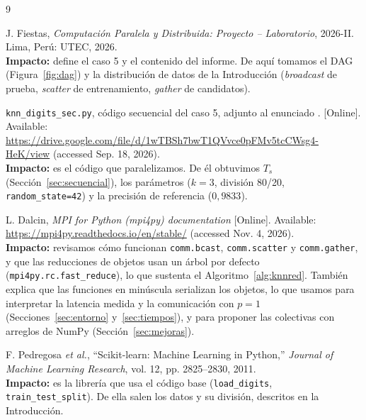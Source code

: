 \documentclass[11pt,a4paper]{article}
\begin{document}
\renewcommand{\refname}{Bibliografía}
\begin{thebibliography}{9}
\setlength{\itemsep}{3pt}

 J. Fiestas, \textit{Computación Paralela y Distribuida: Proyecto -- Laboratorio}, 2026-II. Lima, Perú: UTEC, 2026.\\
\textbf{Impacto:} define el caso 5 y el contenido del informe. De aquí tomamos el DAG (Figura~\ref{fig:dag}) y la distribución de datos de la Introducción (\textit{broadcast} de prueba, \textit{scatter} de entrenamiento, \textit{gather} de candidatos).

 \texttt{knn\_digits\_sec.py}, código secuencial del caso 5, adjunto al enunciado \cite{enunciado}. [Online]. Available: \url{https://drive.google.com/file/d/1wTBSh7bwT1QVvce0pFMv5tcCWsg4-HeK/view} (accessed Sep. 18, 2026).\\
\textbf{Impacto:} es el código que paralelizamos. De él obtuvimos $T_s$ (Sección~\ref{sec:secuencial}), los parámetros ($k=3$, división 80/20, \texttt{random\_state=42}) y la precisión de referencia ($0{,}9833$).

 L. Dalcin, \textit{MPI for Python (mpi4py) documentation} [Online]. Available: \url{https://mpi4py.readthedocs.io/en/stable/} (accessed Nov. 4, 2026).\\
\textbf{Impacto:} revisamos cómo funcionan \texttt{comm.bcast}, \texttt{comm.scatter} y \texttt{comm.gather}, y que las reducciones de objetos usan un árbol por defecto (\texttt{mpi4py.rc.fast\_reduce}), lo que sustenta el Algoritmo~\ref{alg:knnred}. También explica que las funciones en minúscula serializan los objetos, lo que usamos para interpretar la latencia medida y la comunicación con $p=1$ (Secciones~\ref{sec:entorno} y~\ref{sec:tiempos}), y para proponer las colectivas con arreglos de NumPy (Sección~\ref{sec:mejoras}).

 F. Pedregosa \textit{et al.}, ``Scikit-learn: Machine Learning in Python,'' \textit{Journal of Machine Learning Research}, vol. 12, pp. 2825--2830, 2011.\\
\textbf{Impacto:} es la librería que usa el código base (\texttt{load\_digits}, \texttt{train\_test\_split}). De ella salen los datos y su división, descritos en la Introducción.


\end{thebibliography}
\end{document}
